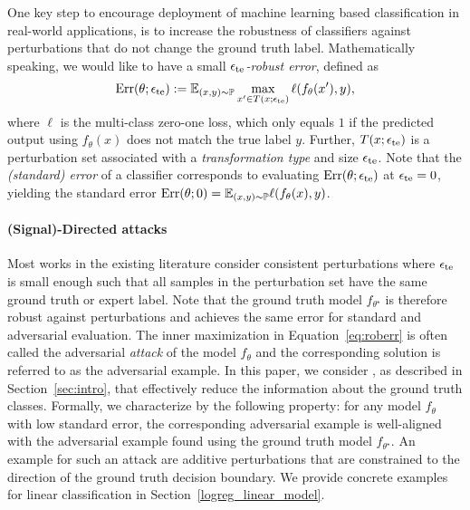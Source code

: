 One key step to encourage deployment of machine learning based classification in real-world applications, is to increase the
robustness of classifiers against perturbations that do not
change the ground truth label. 
Mathematically speaking, we would like to have a small
\emph{$\epsilon_{\text{te}}$-robust error}, defined as
\begin{equation}
  \label{eq:roberr}
  \text{Err}(\theta;\epsilon_{\text{te}}) := \mathbb{E}_{(x, y)\sim \mathbb{P}} \max_{x' \in T({x};{\epsilon_{\text{te}}})} \ell(f_\theta (x'),y),
\end{equation}
where $\ell$ is the multi-class zero-one loss, which only equals $1$ if the predicted
output using $f_\theta(x)$ does not match the true label $y$.
Further, $T({x};{\epsilon_{\text{te}}})$ is a perturbation set associated with a \emph{transformation type} and size $\epsilon_{\text{te}}$. 
Note that the \emph{(standard) error} of a classifier corresponds to evaluating $\text{Err}(\theta;\epsilon_{\text{te}})$ at $\epsilon_{\text{te}} = 0$, yielding the standard error $\text{Err}(\theta;0) =\mathbb{E}_{(x, y)\sim \mathbb{P}} \ell(f_\theta (x),y)$.

\paragraph{(Signal)-Directed attacks}
Most works in the existing literature consider consistent perturbations where
$\epsilon_{\text{te}}$ is small enough such that all samples in the perturbation set
have the same ground truth or expert label. 
Note that the ground truth model $f_{\theta^{\star}}$ is therefore robust against perturbations and achieves the same error for standard and adversarial evaluation. 
The inner maximization in Equation~\eqref{eq:roberr} is often called the adversarial \emph{attack} of the model $f_\theta$ and the corresponding solution is referred to as the adversarial example.
In this paper, we consider \emph{\nameofattacks}, as described in Section~\ref{sec:intro}, that effectively reduce the information about the ground truth classes.
Formally, we characterize \emph{\nameofattacks} by the following property: 
for any model $f_\theta$ with low standard error, the corresponding adversarial example is well-aligned with the adversarial example found using the ground truth model 
$f_{\theta^{\star}}$.
An example for such an attack are additive perturbations that are constrained to the direction of the ground truth decision boundary.  We provide concrete examples for linear classification in  Section~\ref{logreg_linear_model}.
 

